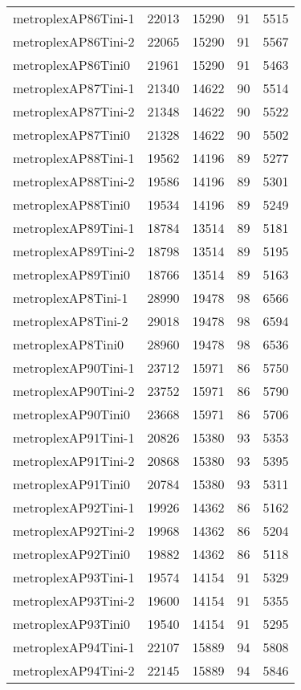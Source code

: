 \begin{longtable}{lrrrr}
metroplexAP86Tini-1 & 22013 & 15290 & 91 & 5515 \\
metroplexAP86Tini-2 & 22065 & 15290 & 91 & 5567 \\
metroplexAP86Tini0 & 21961 & 15290 & 91 & 5463 \\
metroplexAP87Tini-1 & 21340 & 14622 & 90 & 5514 \\
metroplexAP87Tini-2 & 21348 & 14622 & 90 & 5522 \\
metroplexAP87Tini0 & 21328 & 14622 & 90 & 5502 \\
metroplexAP88Tini-1 & 19562 & 14196 & 89 & 5277 \\
metroplexAP88Tini-2 & 19586 & 14196 & 89 & 5301 \\
metroplexAP88Tini0 & 19534 & 14196 & 89 & 5249 \\
metroplexAP89Tini-1 & 18784 & 13514 & 89 & 5181 \\
metroplexAP89Tini-2 & 18798 & 13514 & 89 & 5195 \\
metroplexAP89Tini0 & 18766 & 13514 & 89 & 5163 \\
metroplexAP8Tini-1 & 28990 & 19478 & 98 & 6566 \\
metroplexAP8Tini-2 & 29018 & 19478 & 98 & 6594 \\
metroplexAP8Tini0 & 28960 & 19478 & 98 & 6536 \\
metroplexAP90Tini-1 & 23712 & 15971 & 86 & 5750 \\
metroplexAP90Tini-2 & 23752 & 15971 & 86 & 5790 \\
metroplexAP90Tini0 & 23668 & 15971 & 86 & 5706 \\
metroplexAP91Tini-1 & 20826 & 15380 & 93 & 5353 \\
metroplexAP91Tini-2 & 20868 & 15380 & 93 & 5395 \\
metroplexAP91Tini0 & 20784 & 15380 & 93 & 5311 \\
metroplexAP92Tini-1 & 19926 & 14362 & 86 & 5162 \\
metroplexAP92Tini-2 & 19968 & 14362 & 86 & 5204 \\
metroplexAP92Tini0 & 19882 & 14362 & 86 & 5118 \\
metroplexAP93Tini-1 & 19574 & 14154 & 91 & 5329 \\
metroplexAP93Tini-2 & 19600 & 14154 & 91 & 5355 \\
metroplexAP93Tini0 & 19540 & 14154 & 91 & 5295 \\
metroplexAP94Tini-1 & 22107 & 15889 & 94 & 5808 \\
metroplexAP94Tini-2 & 22145 & 15889 & 94 & 5846 \\

\end{longtable}
